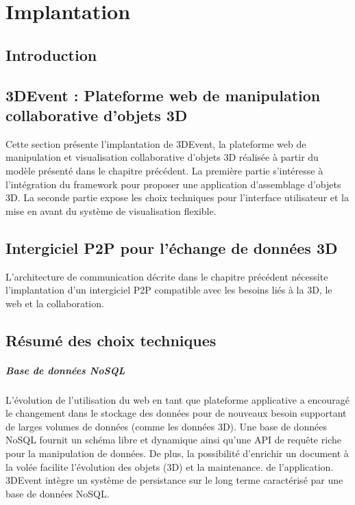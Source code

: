 
\chapter{Implantation}
\chaptertable

\section{Introduction} 


\section{3DEvent : Plateforme web de manipulation collaborative d'objets 3D}
Cette section présente l'implantation de 3DEvent, la plateforme web de 
manipulation et visualisation collaborative d'objets 3D réalisée à partir du modèle 
présenté dans le chapitre précédent. La première partie s'intéresse à l'intégration 
du framework pour proposer une application d'assemblage d'objets 3D. La seconde 
partie expose les choix techniques pour l'interface utilisateur et la mise en avant 
du système de visualisation flexible.



\section{Intergiciel P2P pour l'échange de données 3D}

L'architecture de communication décrite dans le chapitre précédent nécessite 
l'implantation d'un intergiciel P2P compatible avec les besoins liés à la 3D, le 
web et la collaboration. 




\section{Résumé des choix techniques}

\paragraph{Base de données NoSQL}\label{p:nosql} L'évolution de 
l'utilisation du web en tant que plateforme applicative a encouragé le changement 
dans le stockage des données pour de nouveaux besoin supportant de larges 
volumes de données (comme les données 3D). Une base de données \gls{NoSQL} 
fournit un schéma libre et dynamique ainsi qu'une API de requête riche pour la 
manipulation de données. De plus, la possibilité d'enrichir un document à la volée 
facilite l'évolution des objets (3D) et la maintenance. de l'application.
3DEvent intègre un système de persistance sur le long terme caractérisé par une 
base de données \gls{NoSQL}.

